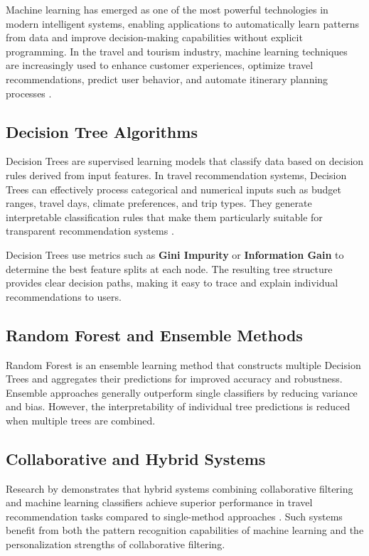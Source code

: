Machine learning has emerged as one of the most powerful technologies in modern intelligent systems, enabling applications to automatically learn patterns from data and improve decision-making capabilities without explicit programming. In the travel and tourism industry, machine learning techniques are increasingly used to enhance customer experiences, optimize travel recommendations, predict user behavior, and automate itinerary planning processes \cite{pedregosa2011}.

\subsection{Decision Tree Algorithms}

Decision Trees are supervised learning models that classify data based on decision rules derived from input features. In travel recommendation systems, Decision Trees can effectively process categorical and numerical inputs such as budget ranges, travel days, climate preferences, and trip types. They generate interpretable classification rules that make them particularly suitable for transparent recommendation systems \cite{pedregosa2011}.

Decision Trees use metrics such as \textbf{Gini Impurity} or \textbf{Information Gain} to determine the best feature splits at each node. The resulting tree structure provides clear decision paths, making it easy to trace and explain individual recommendations to users.

\subsection{Random Forest and Ensemble Methods}

Random Forest is an ensemble learning method that constructs multiple Decision Trees and aggregates their predictions for improved accuracy and robustness. Ensemble approaches generally outperform single classifiers by reducing variance and bias. However, the interpretability of individual tree predictions is reduced when multiple trees are combined.

\subsection{Collaborative and Hybrid Systems}

Research by \citeauthor{ricci2015} demonstrates that hybrid systems combining collaborative filtering and machine learning classifiers achieve superior performance in travel recommendation tasks compared to single-method approaches \cite{ricci2015}. Such systems benefit from both the pattern recognition capabilities of machine learning and the personalization strengths of collaborative filtering.

